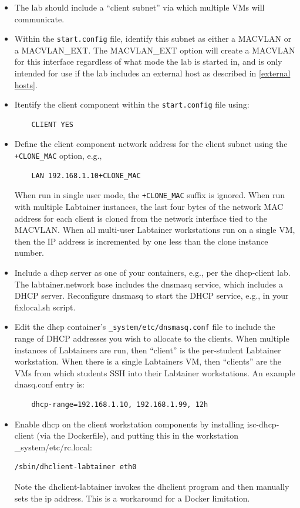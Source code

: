 \documentclass[12pt]{article}
\begin{document}
\begin{itemize}
\item The lab should include a ``client subnet'' via which multiple VMs will communicate.

\item Within the {\tt start.config} file, identify this subnet as either a MACVLAN or
a MACVLAN\_EXT.  The MACVLAN\_EXT
option will create a MACVLAN for this interface regardless of what mode the lab is started in,
and is only intended for use if the lab includes an external host as described in \ref{external hosts}.

\item Itentify the client component within the {\tt start.config} file using:
\begin{verbatim}
    CLIENT YES
\end{verbatim}

\item Define the client component network address for the client subnet using the
{\tt +CLONE\_MAC} option, e.g., 
\begin{verbatim}
    LAN 192.168.1.10+CLONE_MAC
\end{verbatim}
\noindent  When run in single user mode, the {\tt +CLONE\_MAC} suffix is ignored.  When run
with multiple Labtainer instances, the last four bytes of the network MAC address for
each client is cloned from the network interface tied to the MACVLAN.  When all multi-user
Labtainer workstations run on a single VM, then the IP address is incremented by one less
than the clone instance number.

\item Include a dhcp server as one of your containers, e.g., per the dhcp-client lab.  
The labtainer.network base includes the dnsmasq service, which includes a DHCP
server.  Reconfigure dnsmasq to start the DHCP service, e.g., in your fixlocal.sh script.
\item Edit the dhcp container's {\tt \_system/etc/dnsmasq.conf} file to include the
range of DHCP addresses you wish to allocate to the clients.  When multiple instances
of Labtainers are run, then ``client'' is the per-student Labtainer workstation.  When
there is a single Labtainers VM, then ``clients'' are the VMs from which students
SSH into their Labtainer workstations.  An example dnasq.conf entry is:
\begin{verbatim}
    dhcp-range=192.168.1.10, 192.168.1.99, 12h
\end{verbatim}


\item Enable dhcp on the client workstation components by installing isc-dhcp-client
(via the Dockerfile), and putting this in the workstation \_system/etc/rc.local:
\begin{verbatim}
/sbin/dhclient-labtainer eth0
\end{verbatim}
\noindent Note the dhclient-labtainer invokes the dhclient program and then
manually sets the ip address.  This is a workaround for a Docker limitation.


\end{itemize}
\end{document}
